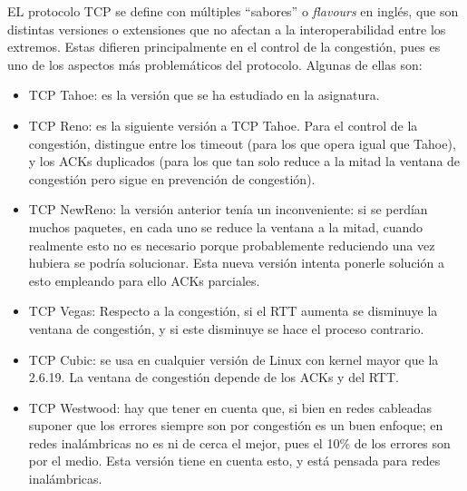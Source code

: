EL protocolo \acrshort{TCP} se define con múltiples ``sabores'' o \textit{flavours} en inglés, que son distintas versiones o extensiones que no afectan a la interoperabilidad entre los extremos. Estas difieren principalmente en el control de la congestión, pues es uno de los aspectos más problemáticos del protocolo.
Algunas de ellas son:
\begin{itemize}
    \item \acrshort{TCP} Tahoe: es la versión que se ha estudiado en la asignatura.
    \item \acrshort{TCP} Reno: es la siguiente versión a \acrshort{TCP} Tahoe. Para el control de la congestión, distingue entre los timeout (para los que opera igual que Tahoe), y los \acrshort{ACK}s duplicados (para los que tan solo reduce a la mitad la ventana de congestión pero sigue en prevención de congestión). 
    \item \acrshort{TCP} NewReno: la versión anterior tenía un inconveniente: si se perdían muchos paquetes, en cada uno se reduce la ventana a la mitad, cuando realmente esto no es necesario porque probablemente reduciendo una vez hubiera se podría solucionar. Esta nueva versión intenta ponerle solución a esto empleando para ello \acrshort{ACK}s parciales. 
    \item \acrshort{TCP} Vegas: Respecto a la congestión, si el \acrshort{RTT} aumenta se disminuye la ventana de congestión, y si este disminuye se hace el proceso contrario.
    \item \acrshort{TCP} Cubic: se usa en cualquier versión de Linux con kernel mayor que la 2.6.19. La ventana de congestión depende de los \acrshort{ACK}s y del \acrshort{RTT}. 
    \item \acrshort{TCP} Westwood: hay que tener en cuenta que, si bien en redes cableadas suponer que los errores siempre son por congestión es un buen enfoque; en redes inalámbricas no es ni de cerca el mejor, pues el 10\% de los errores son por el medio. Esta versión tiene en cuenta esto, y está pensada para redes inalámbricas.
\end{itemize}